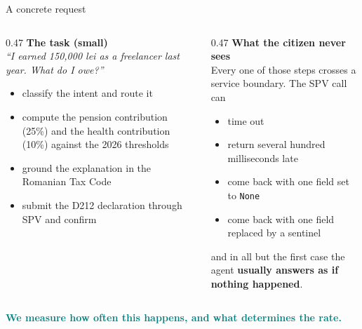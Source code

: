 \documentclass[aspectratio=169,10pt]{beamer}
\newcommand{\hl}[1]{\textcolor{teal}{\textbf{#1}}}      %
\newcommand{\risk}[1]{\textcolor{rust}{\textbf{#1}}}    %
\begin{document}
\begin{frame}{A concrete request}
  \begin{columns}[T]
    \begin{column}{0.47\textwidth}
      \textbf{The task (small)}\\[0.3em]
      \emph{``I earned 150,000 lei as a freelancer last year. What do I owe?''}
      \medskip
      \begin{itemize}\small
        \item classify the intent and route it
        \item compute the pension contribution (25\%) and the health contribution (10\%)
          against the 2026 thresholds
        \item ground the explanation in the Romanian Tax Code
        \item submit the D212 declaration through SPV and confirm
      \end{itemize}
    \end{column}
    \begin{column}{0.47\textwidth}
      \textbf{What the citizen never sees}\\[0.3em]
      Every one of those steps crosses a service boundary. The SPV call can
      \begin{itemize}\small
        \item time out
        \item return several hundred milliseconds late
        \item come back with one field set to \texttt{None}
        \item come back with one field replaced by a sentinel
      \end{itemize}
      \medskip
      and in all but the first case the agent \risk{usually answers as if nothing happened}.
    \end{column}
  \end{columns}
  \vfill
  \centering
  \hl{We measure how often this happens, and what determines the rate.}
\end{frame}
\end{document}
